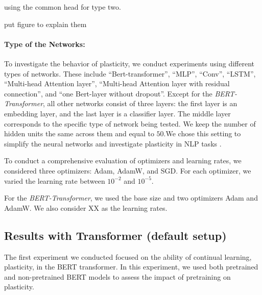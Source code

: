 using the common head for type two.

put figure to explain them

\paragraph{Type of the Networks:}
To investigate the behavior of plasticity, we conduct experiments using different types of networks. These include ``Bert-transformer'', ``MLP'', ``Conv'', ``LSTM'', ``Multi-head Attention layer'',  ``Multi-head Attention layer with residual connection'', and ``one Bert-layer without dropout''.
Except for the \textit{BERT-Transformer}, all other networks consist of three layers: the first layer is an embedding layer, and the last layer is a classifier layer. The middle layer corresponds to the specific type of network being tested. We keep the number of hidden units the same across them and equal to $50$.We chose this setting to simplify the neural networks and investigate plasticity in NLP tasks .


To conduct a comprehensive evaluation of optimizers and learning rates, we considered three optimizers: Adam, AdamW, and SGD. For each optimizer, we varied the learning rate between $10^{-2}$ and $10^{-5}$.

For the \textit{BERT-Transformer}, we used the base size and two optimizers Adam and AdamW. We also consider {\color{red}XX} as the learning rates.



\subsection{Results with Transformer (default setup)}

The first experiment we conducted focused on the ability of continual learning, plasticity, in the BERT transformer. In this experiment, we used both pretrained and non-pretrained BERT models to assess the impact of pretraining on plasticity.

